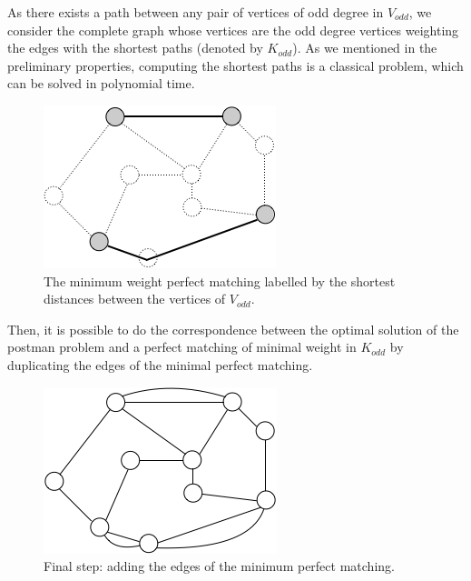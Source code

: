 As there exists a path between any pair of vertices of odd degree in $V_{odd}$,
we consider the complete graph whose vertices are the odd degree vertices weighting the edges with the shortest paths (denoted by $K_{odd}$).
As we mentioned in the preliminary properties, computing the shortest paths is a classical problem, which can be solved in polynomial time. 

\begin{figure}[h]
\begin{center}
       \includegraphics[scale=0.6]{FiguresGraph/EulerienPerfectMatching}
       \caption{The minimum weight perfect matching labelled by the shortest distances between the vertices of $V_{odd}$.}
              \label{fig:eulerianperfectmatching}
\end{center}
\end{figure}
\bigskip

Then, it is possible to do the correspondence between the optimal solution of the postman problem and a perfect matching of minimal weight in $K_{odd}$
by duplicating the edges of the minimal perfect matching.

\begin{figure}[h]
\begin{center}
       \includegraphics[scale=0.6]{FiguresGraph/EulerienFinal}
       \caption{Final step: adding the edges of the minimum perfect matching.}
              \label{fig:eulerianFinal}
\end{center}
\end{figure}

